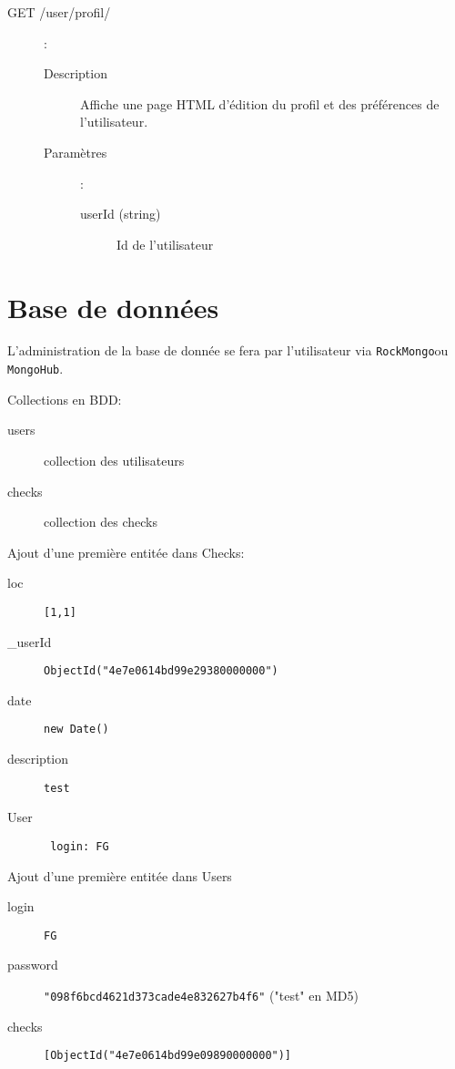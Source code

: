 \documentclass[a4paper,12pt]{report}
\begin{document}
\begin{onehalfspace}
\begin{description}
  \item[GET /user/profil/]:

    \begin{description}
      \item[Description] Affiche une page HTML d'édition du profil et des préférences de l'utilisateur.

      \item[Paramètres]:
        \begin{description}
          \item[userId (string)] Id de l'utilisateur
        \end{description}
    \end{description}

\end{description}

\chapter{Base de données}

L'administration de la base de donnée se fera par l'utilisateur via \lstinline{RockMongo}ou \lstinline{MongoHub}.

Collections en BDD:
\begin{description}
  \item[users] collection des utilisateurs
  \item[checks] collection des checks
\end{description}

Ajout d'une première entitée dans Checks:
\begin{description}
  \item[loc] \lstinline{[1,1]}
  \item[\_userId] \lstinline{ObjectId("4e7e0614bd99e29380000000")}
  \item[date] \lstinline{new Date()}
  \item[description] \lstinline{test}
  \item[User] \lstinline{ login: FG }
\end{description}

Ajout d'une première entitée dans Users
\begin{description}
  \item[login] \lstinline{FG}
  \item[password] \lstinline{"098f6bcd4621d373cade4e832627b4f6"} ("test" en MD5)
  \item[checks] \lstinline{[ObjectId("4e7e0614bd99e09890000000")]}
\end{description}


\end{onehalfspace}
\end{document}
